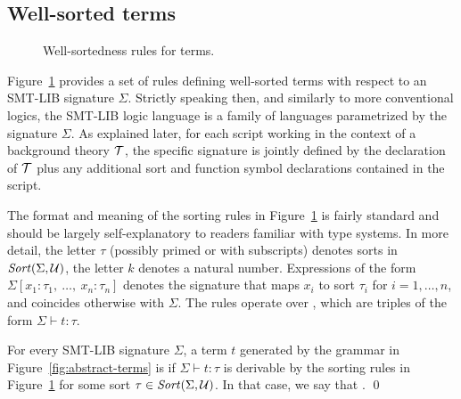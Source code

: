 


\subsection{Well-sorted terms}
 
\begin{figure}
 \termrules
\caption{Well-sortedness rules for terms.}
\label{fig:well-sorted-terms}
\end{figure}

Figure~\ref{fig:well-sorted-terms} provides a set of rules defining 
well-sorted terms with respect to an SMT-LIB signature $\Sigma$.
Strictly speaking then, and similarly to more conventional logics,
the SMT-LIB logic language is a family of languages parametrized 
by the signature $\Sigma$.
As explained later, 
for each script working in the context of a background theory $\mathcal{T}$,
the specific signature is jointly defined by the declaration of $\mathcal{T}$ plus
any additional sort and function symbol declarations contained in the script.

The format and meaning of the sorting rules in Figure~\ref{fig:well-sorted-terms} 
is fairly standard and should be largely self-explanatory 
to readers familiar with type systems.
In more detail, the letter $\tau$ (possibly primed or with subscripts) 
denotes sorts in $\mathit{Sort}(\Sigma, \mathcal{U})$,
the letter $k$ denotes a natural number.
%
Expressions of the form $\Sigma[x_1:\tau_1,\: \ldots,\: x_n:\tau_n]$ 
denotes the signature 
that maps $x_i$ to sort $\tau_i$ for $i=1,\ldots,n$, and 
coincides otherwise with $\Sigma$.
The rules operate over ,
which are triples of the form $\Sigma \vdash t : \tau$.

\begin{definition}
For every SMT-LIB signature $\Sigma$,
a term $t$ generated by the grammar in Figure~\ref{fig:abstract-terms}
is 
if $\Sigma \vdash t : \tau$ is derivable 
by the sorting rules in Figure~\ref{fig:well-sorted-terms}
for some sort $\tau \in \mathit{Sort}(\Sigma,\mathcal{U})$.
In that case, 
we say that .
\qed
\end{definition}

